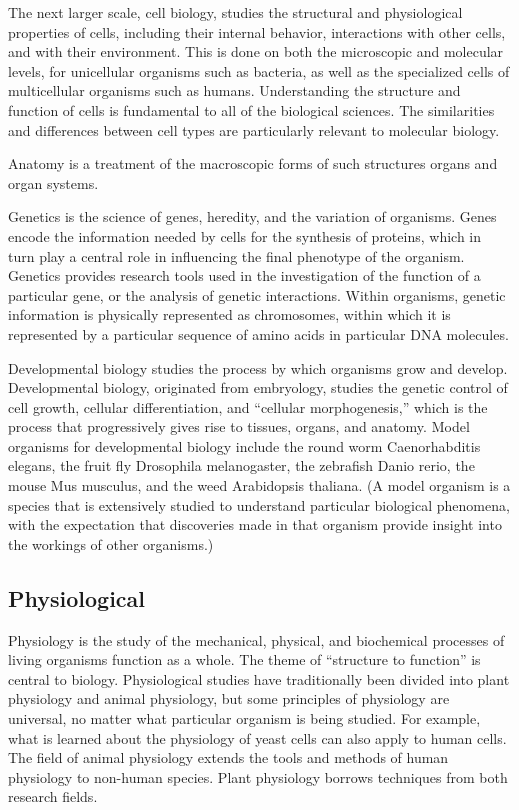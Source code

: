 \documentclass[
]{book}
\begin{document}
The next larger scale, cell biology, studies the structural and physiological properties of cells, including their internal behavior, interactions with other cells, and with their environment. This is done on both the microscopic and molecular levels, for unicellular organisms such as bacteria, as well as the specialized cells of multicellular organisms such as humans. Understanding the structure and function of cells is fundamental to all of the biological sciences. The similarities and differences between cell types are particularly relevant to molecular biology.

Anatomy is a treatment of the macroscopic forms of such structures organs and organ systems.

Genetics is the science of genes, heredity, and the variation of organisms. Genes encode the information needed by cells for the synthesis of proteins, which in turn play a central role in influencing the final phenotype of the organism. Genetics provides research tools used in the investigation of the function of a particular gene, or the analysis of genetic interactions. Within organisms, genetic information is physically represented as chromosomes, within which it is represented by a particular sequence of amino acids in particular DNA molecules.

Developmental biology studies the process by which organisms grow and develop. Developmental biology, originated from embryology, studies the genetic control of cell growth, cellular differentiation, and ``cellular morphogenesis,'' which is the process that progressively gives rise to tissues, organs, and anatomy. Model organisms for developmental biology include the round worm Caenorhabditis elegans, the fruit fly Drosophila melanogaster, the zebrafish Danio rerio, the mouse Mus musculus, and the weed Arabidopsis thaliana. (A model organism is a species that is extensively studied to understand particular biological phenomena, with the expectation that discoveries made in that organism provide insight into the workings of other organisms.)

\hypertarget{physiological}{%
\subsection{Physiological}\label{physiological}}

Physiology is the study of the mechanical, physical, and biochemical processes of living organisms function as a whole. The theme of ``structure to function'' is central to biology. Physiological studies have traditionally been divided into plant physiology and animal physiology, but some principles of physiology are universal, no matter what particular organism is being studied. For example, what is learned about the physiology of yeast cells can also apply to human cells. The field of animal physiology extends the tools and methods of human physiology to non-human species. Plant physiology borrows techniques from both research fields.
\end{document}
